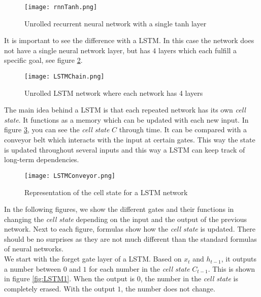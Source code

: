 \begin{figure}[!htb]
	\centering
	\texttt{[image: rnnTanh.png]}
	\caption{Unrolled recurrent neural network with a single tanh layer \cite{lstmGood:online}}
	\label{fig:rnnTanh}
\end{figure} 

It is important to see the difference with a LSTM. In this case the network does not have a single neural network layer, but has $4$ layers which each fulfill a specific goal, see figure \ref{fig:LSTMChain}.\\

\begin{figure}[!htb]
	\centering
	\texttt{[image: LSTMChain.png]}
	\caption{Unrolled LSTM network where each network has 4 layers \cite{lstmGood:online}}
	\label{fig:LSTMChain}
\end{figure} 

The main idea behind a LSTM is that each repeated network has its own \textit{cell state}. It functions as a memory which can be updated with each new input. In figure \ref{fig:LSTMConveyor}, you can see the \textit{cell state} $C$ through time. It can be compared with a conveyor belt which interacts with the input at certain gates. This way the state is updated throughout several inputs and this way a LSTM can keep track of long-term dependencies. \\

\begin{figure}[!htb]
	\centering
	\texttt{[image: LSTMConveyor.png]}
	\caption{Representation of the cell state for a LSTM network \cite{lstmGood:online}}
	\label{fig:LSTMConveyor}
\end{figure} 

In the following figures, we show the different gates and their functions in changing the \textit{cell state} depending on the input and the output of the previous network. Next to each figure, formulas show how the \textit{cell state} is updated. There should be no surprises as they are not much different than the standard formulas of neural networks. \\

We start with the forget gate layer of a LSTM. Based on $x_t$ and $h_{t-1}$, it outputs a number between $0$ and $1$ for each number in the \textit{cell state} $C_{t-1}$. This is shown in figure \ref{fig:LSTM1}. When the output is $0$, the number in the \textit{cell state} is completely erased. With the output $1$, the number does not change. \\

